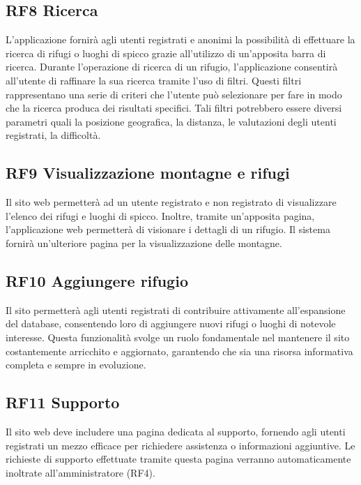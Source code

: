 \documentclass[a4paper,12pt]{article}
\begin{document}
\subsection*{RF8 Ricerca}
L'applicazione fornirà agli utenti registrati e anonimi la possibilità di effettuare la ricerca di rifugi o luoghi di spicco grazie all’utilizzo di un’apposita barra di ricerca.\newline
Durante l'operazione di ricerca di un rifugio, l'applicazione consentirà all'utente di raffinare la sua ricerca tramite l'uso di filtri.\newline
Questi filtri rappresentano una serie di criteri che l'utente può selezionare per fare in modo che la ricerca produca dei risultati specifici.
Tali filtri potrebbero essere diversi parametri quali la posizione geografica, la distanza, le valutazioni degli utenti registrati, la difficoltà.


\subsection*{RF9 Visualizzazione montagne e rifugi}
Il sito web permetterà ad un utente registrato e non registrato di visualizzare l'elenco dei rifugi e luoghi di spicco.\newline
Inoltre, tramite un'apposita pagina, l'applicazione web permetterà di visionare i dettagli di un rifugio.\newline
Il sistema fornirà un'ulteriore pagina per la visualizzazione delle montagne.


\subsection*{RF10 Aggiungere rifugio}
Il sito permetterà agli utenti registrati di contribuire attivamente all'espansione del database, consentendo loro di aggiungere nuovi rifugi o luoghi di notevole interesse. Questa funzionalità svolge un ruolo fondamentale nel mantenere il sito costantemente arricchito e aggiornato, garantendo che sia una risorsa informativa completa e sempre in evoluzione.

\subsection*{RF11 Supporto}
Il sito web deve includere una pagina dedicata al supporto, fornendo agli utenti registrati un mezzo efficace per richiedere assistenza o informazioni aggiuntive. Le richieste di supporto effettuate tramite questa pagina verranno automaticamente inoltrate all'amministratore (RF4).
\end{document}
